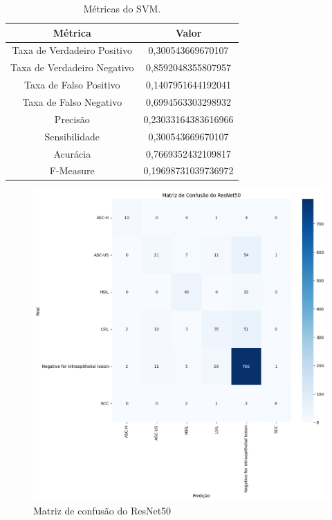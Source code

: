 \documentclass[12pt]{article}
\begin{document}
\begin{table}[]
    \centering
    \begin{tabular}{|c|c|}
        \hline
         Métrica & Valor\\
         \hline
         Taxa de Verdadeiro Positivo & 0,300543669670107\\
         \hline
         Taxa de Verdadeiro Negativo & 0,8592048355807957\\
         \hline
         Taxa de Falso Positivo & 0,1407951644192041\\
         \hline
         Taxa de Falso Negativo & 0,6994563303298932\\
         \hline
         Precisão & 0,23033164383616966\\
         \hline
         Sensibilidade & 0,300543669670107\\
         \hline
         Acurácia & 0,7669352432109817\\
         \hline
         F-Measure & 0,19698731039736972\\
         \hline
    \end{tabular}
    \caption{Métricas do SVM.}
    \label{tab:metricas-svm}
\end{table}

\begin{figure}
    \centering
    \includegraphics[width=\textwidth]{Matriz confusao ResNet50.png}
    \caption{Matriz de confusão do ResNet50}
    \label{fig:matrix-confusao-resnet50}
\end{figure}
\end{document}
